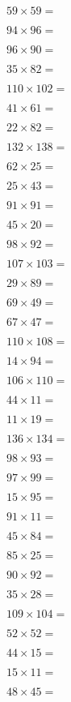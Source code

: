 \documentclass{numbersense}
\begin{document}
\begin{questions}
\q[3481] $59 \times 59 = $\ans

\q[9024] $94 \times 96 = $\ans

\q[8640] $96 \times 90 = $\ans

\q[2870] $35 \times 82 = $\ans

\q[11220] $110 \times 102 = $\ans

\q[2501] $41 \times 61 = $\ans

\q[1804] $22 \times 82 = $\ans

\q[18216] $132 \times 138 = $\ans

\q[1550] $62 \times 25 = $\ans

\q[1075] $25 \times 43 = $\ans

\q[8281] $91 \times 91 = $\ans

\q[900] $45 \times 20 = $\ans

\q[9016] $98 \times 92 = $\ans

\q[11021] $107 \times 103 = $\ans

\q[2581] $29 \times 89 = $\ans

\q[3381] $69 \times 49 = $\ans

\q[3149] $67 \times 47 = $\ans

\q[11880] $110 \times 108 = $\ans

\q[1316] $14 \times 94 = $\ans

\q[11660] $106 \times 110 = $\ans

\q[484] $44 \times 11 = $\ans

\q[209] $11 \times 19 = $\ans

\q[18224] $136 \times 134 = $\ans

\q[9114] $98 \times 93 = $\ans

\q[9603] $97 \times 99 = $\ans

\q[1425] $15 \times 95 = $\ans

\q[1001] $91 \times 11 = $\ans

\q[3780] $45 \times 84 = $\ans

\q[2125] $85 \times 25 = $\ans

\q[8280] $90 \times 92 = $\ans

\q[980] $35 \times 28 = $\ans

\q[11336] $109 \times 104 = $\ans

\q[2704] $52 \times 52 = $\ans

\q[660] $44 \times 15 = $\ans

\q[165] $15 \times 11 = $\ans

\q[2160] $48 \times 45 = $\ans


\end{questions}
\end{document}
